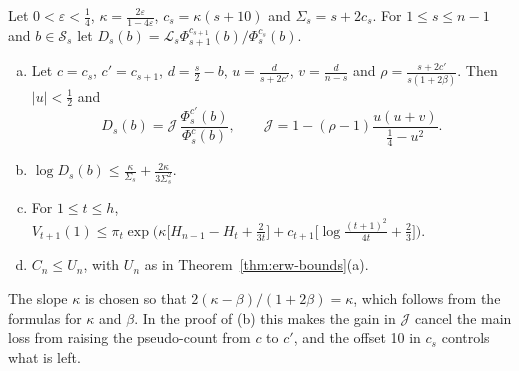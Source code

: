 \begin{proposition}\label{prop:A-super}
Let $0<\varepsilon<\frac14$, $\kappa=\frac{2\varepsilon}{1-4\varepsilon}$,
$c_s=\kappa(s+10)$ and $\Sigma_s=s+2c_s$. For $1\le s\le n-1$ and
$b\in\mathcal S_s$ let
$D_s(b)=\mathcal L_s\Phi^{c_{s+1}}_{s+1}(b)\big/\Phi^{c_s}_s(b)$.
\begin{enumerate}[(a)]
\item Let $c=c_s$, $c'=c_{s+1}$, $d=\frac s2-b$, $u=\frac{d}{s+2c'}$,
$v=\frac d{n-s}$ and $\rho=\frac{s+2c'}{s(1+2\beta)}$. Then $|u|<\frac12$
and
\[
 D_s(b)=\mathcal J\,\frac{\Phi^{c'}_s(b)}{\Phi^{c}_s(b)},\qquad
 \mathcal J=1-(\rho-1)\frac{u(u+v)}{\frac14-u^2}.
\]
\item $\log D_s(b)\le\frac{\kappa}{\Sigma_s}+\frac{2\kappa}{3\Sigma_s^2}$.
\item For $1\le t\le h$,
$V_{t+1}(1)\le\pi_t\exp\bigl(\kappa\bigl[H_{n-1}-H_t+\frac2{3t}\bigr]
+c_{t+1}\bigl[\log\frac{(t+1)^2}{4t}+\frac23\bigr]\bigr)$.
\item $C_n\le U_n$, with $U_n$ as in Theorem~\ref{thm:erw-bounds}(a).
\end{enumerate}
\end{proposition}

The slope $\kappa$ is chosen so that $2(\kappa-\beta)/(1+2\beta)=\kappa$,
which follows from the formulas for $\kappa$ and $\beta$. In the proof of (b)
this makes the gain in $\mathcal J$ cancel the main loss from raising the
pseudo-count from $c$ to $c'$, and the offset 10 in $c_s$ controls what is
left.

